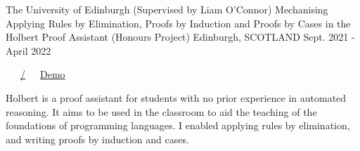 \begin{cventries}
  \cventry
    {The University of Edinburgh (Supervised by Liam O'Connor)} %
    {Mechanising Applying Rules by Elimination, Proofs by Induction and Proofs by Cases in the Holbert Proof Assistant (Honours Project)} %
    {Edinburgh, SCOTLAND} %
    {Sept. 2021 - April 2022} %
    {
      \color{awesome}  \color{graytext}\ \ \ \href{https://github.com/chrisjpm/holbert}{\faGithub\acvHeaderIconSep\@chrisjpm/\@holbert}\ \ \ \href{http://liamoc.net/holbert}{\faGlobe\acvHeaderIconSep\@Holbert Demo}%
      \vspace{1.6em}
      \begin{cvitems} %
        \item Holbert is a proof assistant for students with no prior experience in automated reasoning. It aims to be used in the classroom to aid the teaching of the foundations of programming languages. I enabled applying rules by elimination, and writing proofs by induction and cases.
      \end{cvitems}
    }
    


\end{cventries}
